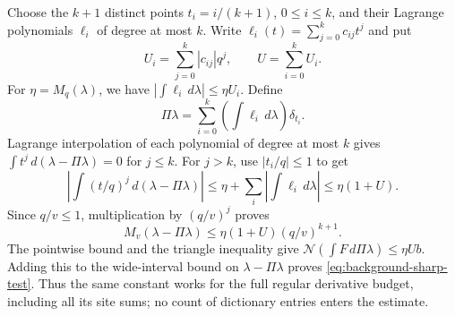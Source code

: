 Choose the $k+1$ distinct points $t_i=i/(k+1)$, $0\le i\le k$,
and their Lagrange polynomials $\ell_i$ of degree at most $k$.
Write $\ell_i(t)=\sum_{j=0}^kc_{ij}t^j$ and put
\[
                    U_i=\sum_{j=0}^k|c_{ij}|q^j,
                    \qquad U=\sum_{i=0}^kU_i.
\]
For $\eta=M_q(\lambda)$, we have
$|\int\ell_i\,d\lambda|\le\eta U_i$. Define
\[
              \Pi\lambda=\sum_{i=0}^k
                         \left(\int\ell_i\,d\lambda\right)\delta_{t_i}.
\]
Lagrange interpolation of each polynomial of degree at most $k$
gives $\int t^j\,d(\lambda-\Pi\lambda)=0$ for $j\le k$.
For $j>k$, use $|t_i/q|\le1$ to get
\[
 \left|\int(t/q)^j\,d(\lambda-\Pi\lambda)\right|
          \le\eta+\sum_i\left|\int\ell_i\,d\lambda\right|
          \le\eta(1+U).
\]
Since $q/v\le1$, multiplication by $(q/v)^j$ proves
\[
 M_v(\lambda-\Pi\lambda)\le\eta(1+U)(q/v)^{k+1}.
\]
The pointwise bound and the triangle inequality give
$\mathcal N(\int F\,d\Pi\lambda)\le\eta Ub$.
Adding this to the wide-interval bound on $\lambda-\Pi\lambda$
proves \eqref{eq:background-sharp-test}. Thus the same constant
works for the full regular derivative budget, including all its
site sums; no count of dictionary entries enters the estimate.


